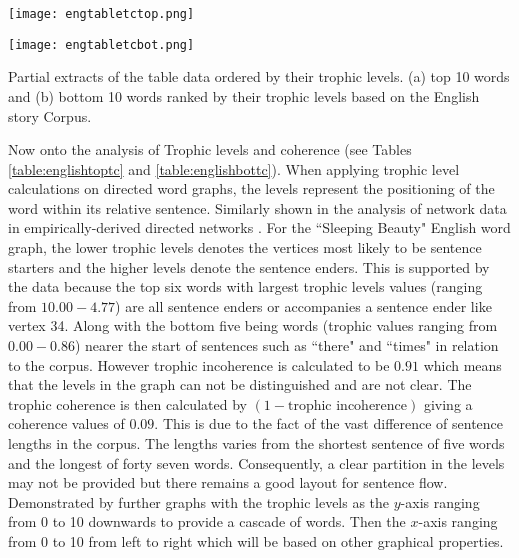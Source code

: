 \begin{table}[!htb]
\centering
\begin{subtable}{.45\textwidth}
	\centering
	\texttt{[image: engtabletctop.png]}
	\caption{}
	\label{table:englishtoptc}
\end{subtable}
\hfill
\begin{subtable}{.45\textwidth}
	\centering
	\texttt{[image: engtabletcbot.png]}
	\caption{}
	\label{table:englishbottc}
\end{subtable}
\caption{Partial extracts of the table data ordered by their trophic levels. (a) top 10 words and (b) bottom 10 words ranked by their trophic levels based on the English story Corpus.}
\end{table}

Now onto the analysis of Trophic levels and coherence (see Tables \ref{table:englishtoptc} and \ref{table:englishbottc}). When applying trophic level calculations on directed word graphs, the levels represent the positioning of the word within its relative sentence. Similarly shown in the analysis of network data in empirically-derived directed networks \cite{johnson2017looplessness}. For the ``Sleeping Beauty" English word graph, the lower trophic levels denotes the vertices most likely to be sentence starters and the higher levels denote the sentence enders. This is supported by the data because the top six words with largest trophic levels values (ranging from $10.00-4.77$) are all sentence enders or accompanies a sentence ender like vertex 34. Along with the bottom five being words (trophic values ranging from $0.00-0.86$) nearer the start of sentences such as ``there" and ``times" in relation to the corpus. However trophic incoherence is calculated to be $0.91$ which means that the levels in the graph can not be distinguished and are not clear. The $\text{trophic coherence}$ is then calculated by $(1 - \text{trophic incoherence})$ giving a coherence values of $0.09$. This is due to the fact of the vast difference of sentence lengths in the corpus. The lengths varies from the shortest sentence of five words and the longest of forty seven words. Consequently, a clear partition in the levels may not be provided but there remains a good layout for sentence flow. Demonstrated by further graphs with the trophic levels as the $y$-axis ranging from 0 to 10 downwards to provide a cascade of words. Then the $x$-axis ranging from 0 to 10 from left to right which will be based on other graphical properties.

